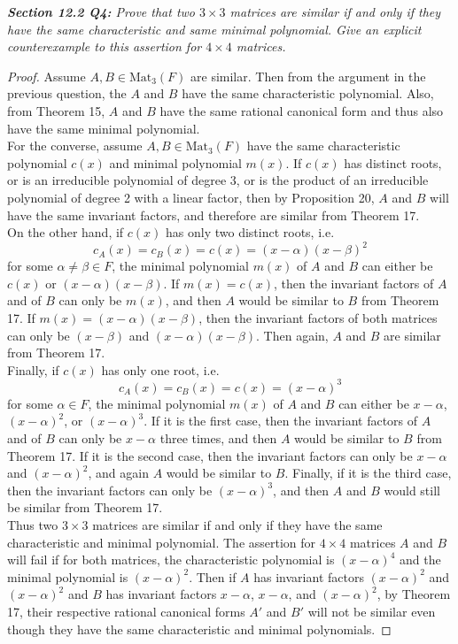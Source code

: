 \documentclass{article}
\begin{document}
\it \textbf{Section 12.2 Q4:} Prove that two $3\times3$ matrices are
  similar if and only if they have the same characteristic and same minimal
  polynomial. Give an explicit counterexample to this assertion for
  $4\times4$ matrices.

  \begin{proof}
    Assume $A,B\in\text{Mat}_3(F)$ are similar. Then from the argument in
    the previous question, the $A$ and $B$ have the same characteristic
    polynomial. Also, from Theorem 15, $A$ and $B$ have the same rational
    canonical form and thus also have the same minimal polynomial.\\

    For the converse, assume $A,B\in\text{Mat}_3(F)$ have the same
    characteristic polynomial $c(x)$ and minimal polynomial $m(x)$. If
    $c(x)$ has distinct roots, or is an irreducible polynomial of degree 3,
    or is the product of an irreducible polynomial of degree 2 with a
    linear factor, then by Proposition 20, $A$ and $B$ will have the same
    invariant factors, and therefore are similar from Theorem 17. \\

    On the other hand, if $c(x)$ has only two distinct roots, i.e.
    \[c_A(x)=c_B(x)=c(x) =(x-\alpha)(x-\beta)^2\]
    for some $\alpha\neq\beta\in F$, the minimal polynomial $m(x)$ of $A$
    and $B$ can either be $c(x)$ or $(x-\alpha)(x-\beta)$. If
    $m(x)=c(x)$, then the invariant factors of $A$ and of $B$ can only be
    $m(x)$, and then $A$ would be similar to $B$ from Theorem 17. If
    $m(x)=(x-\alpha)(x-\beta)$, then the invariant factors of both matrices
    can only be $(x-\beta)$ and $(x-\alpha)(x-\beta)$. Then again, $A$ and
    $B$ are similar from Theorem 17. \\

    Finally, if $c(x)$ has only one root, i.e.
    \[c_A(x)=c_B(x)=c(x) =(x-\alpha)^3\]
    for some $\alpha\in F$, the minimal polynomial $m(x)$ of $A$ and $B$
    can either be $x-\alpha$, $(x-\alpha)^2$, or $(x-\alpha)^3$. If it is
    the first case, then the invariant factors of $A$ and of $B$ can only
    be $x-\alpha$ three times, and then $A$ would be similar to $B$ from
    Theorem 17. If it is the second case, then the invariant factors can
    only be $x-\alpha$ and $(x-\alpha)^2$, and again $A$ would be similar
    to $B$. Finally, if it is the third case, then the invariant factors
    can only be $(x-\alpha)^3$, and then $A$ and $B$ would still be
    similar from Theorem 17. \\

    Thus two $3\times3$ matrices are similar if and only if they have the
    same characteristic and minimal polynomial. The assertion for
    $4\times4$ matrices $A$ and $B$ will fail if for both matrices, the
    characteristic polynomial is $(x-\alpha)^4$ and the minimal polynomial
    is $(x-\alpha)^2$. Then if $A$ has invariant factors $(x-\alpha)^2$ and
    $(x-\alpha)^2$ and $B$ has invariant factors $x-\alpha$, $x-\alpha$,
    and $(x-\alpha)^2$, by Theorem 17, their respective rational canonical
    forms $A'$ and $B'$ will not be similar even though they have the same
    characteristic and minimal polynomials.
  \end{proof}
\end{document}
